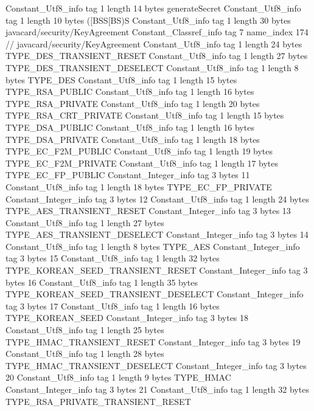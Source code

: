 {{{		}
		Constant_Utf8_info {
			tag	1
			length	14
			bytes	generateSecret
		}
		Constant_Utf8_info {
			tag	1
			length	10
			bytes	([BSS[BS)S
		}
		Constant_Utf8_info {
			tag	1
			length	30
			bytes	javacard/security/KeyAgreement
		}
		Constant_Classref_info {
			tag	7
			name_index	174		// javacard/security/KeyAgreement
		}
		Constant_Utf8_info {
			tag	1
			length	24
			bytes	TYPE_DES_TRANSIENT_RESET
		}
		Constant_Utf8_info {
			tag	1
			length	27
			bytes	TYPE_DES_TRANSIENT_DESELECT
		}
		Constant_Utf8_info {
			tag	1
			length	8
			bytes	TYPE_DES
		}
		Constant_Utf8_info {
			tag	1
			length	15
			bytes	TYPE_RSA_PUBLIC
		}
		Constant_Utf8_info {
			tag	1
			length	16
			bytes	TYPE_RSA_PRIVATE
		}
		Constant_Utf8_info {
			tag	1
			length	20
			bytes	TYPE_RSA_CRT_PRIVATE
		}
		Constant_Utf8_info {
			tag	1
			length	15
			bytes	TYPE_DSA_PUBLIC
		}
		Constant_Utf8_info {
			tag	1
			length	16
			bytes	TYPE_DSA_PRIVATE
		}
		Constant_Utf8_info {
			tag	1
			length	18
			bytes	TYPE_EC_F2M_PUBLIC
		}
		Constant_Utf8_info {
			tag	1
			length	19
			bytes	TYPE_EC_F2M_PRIVATE
		}
		Constant_Utf8_info {
			tag	1
			length	17
			bytes	TYPE_EC_FP_PUBLIC
		}
		Constant_Integer_info {
			tag	3
			bytes	11
		}
		Constant_Utf8_info {
			tag	1
			length	18
			bytes	TYPE_EC_FP_PRIVATE
		}
		Constant_Integer_info {
			tag	3
			bytes	12
		}
		Constant_Utf8_info {
			tag	1
			length	24
			bytes	TYPE_AES_TRANSIENT_RESET
		}
		Constant_Integer_info {
			tag	3
			bytes	13
		}
		Constant_Utf8_info {
			tag	1
			length	27
			bytes	TYPE_AES_TRANSIENT_DESELECT
		}
		Constant_Integer_info {
			tag	3
			bytes	14
		}
		Constant_Utf8_info {
			tag	1
			length	8
			bytes	TYPE_AES
		}
		Constant_Integer_info {
			tag	3
			bytes	15
		}
		Constant_Utf8_info {
			tag	1
			length	32
			bytes	TYPE_KOREAN_SEED_TRANSIENT_RESET
		}
		Constant_Integer_info {
			tag	3
			bytes	16
		}
		Constant_Utf8_info {
			tag	1
			length	35
			bytes	TYPE_KOREAN_SEED_TRANSIENT_DESELECT
		}
		Constant_Integer_info {
			tag	3
			bytes	17
		}
		Constant_Utf8_info {
			tag	1
			length	16
			bytes	TYPE_KOREAN_SEED
		}
		Constant_Integer_info {
			tag	3
			bytes	18
		}
		Constant_Utf8_info {
			tag	1
			length	25
			bytes	TYPE_HMAC_TRANSIENT_RESET
		}
		Constant_Integer_info {
			tag	3
			bytes	19
		}
		Constant_Utf8_info {
			tag	1
			length	28
			bytes	TYPE_HMAC_TRANSIENT_DESELECT
		}
		Constant_Integer_info {
			tag	3
			bytes	20
		}
		Constant_Utf8_info {
			tag	1
			length	9
			bytes	TYPE_HMAC
		}
		Constant_Integer_info {
			tag	3
			bytes	21
		}
		Constant_Utf8_info {
			tag	1
			length	32
			bytes	TYPE_RSA_PRIVATE_TRANSIENT_RESET
}}}
